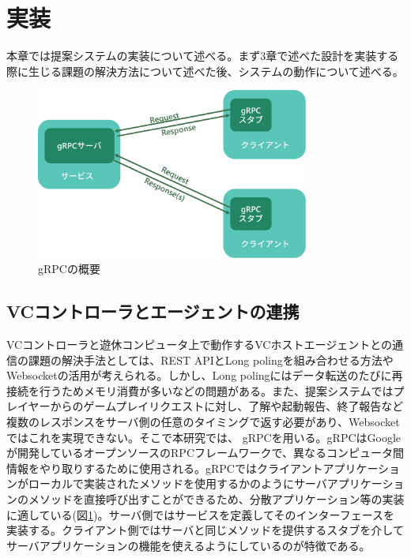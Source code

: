 \section{実装}
本章では提案システムの実装について述べる。まず3章で述べた設計を実装する際に生じる課題の解決方法について述べた後、システムの動作について述べる。




\begin{figure}[t]
    \centering
    \includegraphics[width=0.8\textwidth,keepaspectratio,clip]{img/grpc.eps}
    \caption{gRPCの概要}
    \label{fig:grpc}
\end{figure}

\subsection{VCコントローラとエージェントの連携}
VCコントローラと遊休コンピュータ上で動作するVCホストエージェントとの通信の課題の解決手法としては、REST APIとLong poling\cite{longpoling}を組み合わせる方法やWebsocket\cite{websocket}の活用が考えられる。しかし、Long polingにはデータ転送のたびに再接続を行うためメモリ消費が多いなどの問題がある。また、提案システムではプレイヤーからのゲームプレイリクエストに対し、了解や起動報告、終了報告など複数のレスポンスをサーバ側の任意のタイミングで返す必要があり、Websocketではこれを実現できない。そこで本研究では、
gRPC\cite{grpc}を用いる。gRPCはGoogleが開発しているオープンソースのRPCフレームワークで、異なるコンピュータ間情報をやり取りするために使用される。gRPCではクライアントアプリケーションがローカルで実装されたメソッドを使用するかのようにサーバアプリケーションのメソッドを直接呼び出すことができるため、分散アプリケーション等の実装に適している(図\ref{fig:grpc})。サーバ側ではサービスを定義してそのインターフェースを実装する。クライアント側ではサーバと同じメソッドを提供するスタブを介してサーバアプリケーションの機能を使えるようにしているのが特徴である。

